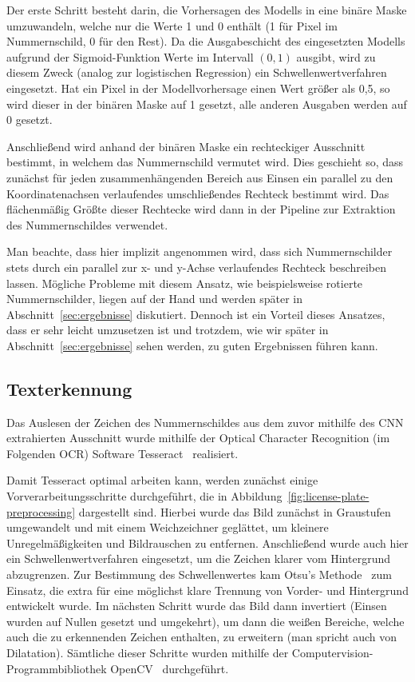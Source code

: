 Der erste Schritt besteht darin, die Vorhersagen des Modells in eine
bin\"are Maske umzuwandeln, welche nur die Werte 1 und 0 enth\"alt
(1 f\"ur Pixel im Nummernschild, 0 f\"ur den Rest).
Da die Ausgabeschicht des eingesetzten Modells aufgrund der
Sigmoid-Funktion Werte im Intervall $(0, 1)$ ausgibt, wird
zu diesem Zweck (analog zur logistischen Regression)
ein Schwellenwertverfahren eingesetzt.
Hat ein Pixel in der Modellvorhersage einen Wert gr\"o{\ss}er als
0,5, so wird dieser in der bin\"aren Maske auf 1 gesetzt, alle
anderen Ausgaben werden auf 0 gesetzt.

Anschlie{\ss}end wird anhand der bin\"aren Maske ein rechteckiger
Ausschnitt bestimmt, in welchem das Nummernschild vermutet wird.
Dies geschieht so, dass zun\"achst f\"ur jeden zusammenh\"angenden
Bereich aus Einsen ein parallel zu den Koordinatenachsen
verlaufendes umschlie{\ss}endes Rechteck bestimmt wird.
Das fl\"achenm\"a{\ss}ig Gr\"o{\ss}te dieser Rechtecke wird dann in
der Pipeline zur Extraktion des Nummernschildes verwendet.

Man beachte, dass hier implizit angenommen wird, dass sich
Nummernschilder stets durch ein parallel zur x- und y-Achse
verlaufendes Rechteck beschreiben lassen.
M\"ogliche Probleme mit diesem Ansatz, wie beispielsweise
rotierte Nummernschilder, liegen auf der Hand und werden sp\"ater
in Abschnitt~\ref{sec:ergebnisse} diskutiert.
Dennoch ist ein Vorteil dieses Ansatzes, dass er sehr leicht
umzusetzen ist und trotzdem, wie wir sp\"ater in
Abschnitt~\ref{sec:ergebnisse} sehen werden, zu guten Ergebnissen
f\"uhren kann.

\subsection{Texterkennung}
\label{sec:texterkennung}

Das Auslesen der Zeichen des Nummernschildes aus dem zuvor mithilfe des
CNN extrahierten Ausschnitt wurde mithilfe der
Optical Character Recognition (im Folgenden OCR) Software
Tesseract~\cite{tesseract} realisiert.

Damit Tesseract optimal arbeiten kann, werden zun\"achst
einige Vorverarbeitungsschritte durchgef\"uhrt, die in
Abbildung~\ref{fig:license-plate-preprocessing} dargestellt sind.
Hierbei wurde das Bild zun\"achst in Graustufen umgewandelt und
mit einem Weichzeichner gegl\"attet, um kleinere Unregelm\"a{\ss}igkeiten
und Bildrauschen zu entfernen.
Anschlie{\ss}end wurde auch hier ein Schwellenwertverfahren
eingesetzt, um die Zeichen klarer vom Hintergrund abzugrenzen.
Zur Bestimmung des Schwellenwertes kam Otsu's Methode~\cite{otsu} zum Einsatz,
die extra f\"ur eine
m\"oglichst klare Trennung von Vorder- und Hintergrund
entwickelt wurde. Im n\"achsten Schritt wurde das Bild dann
invertiert (Einsen wurden auf Nullen gesetzt und umgekehrt), um dann
die wei{\ss}en Bereiche, welche auch die zu erkennenden Zeichen
enthalten, zu erweitern (man spricht auch von Dilatation).
S\"amtliche dieser Schritte wurden mithilfe der
Computervision-Programmbibliothek OpenCV~\cite{opencv_library}
durchgef\"uhrt.

